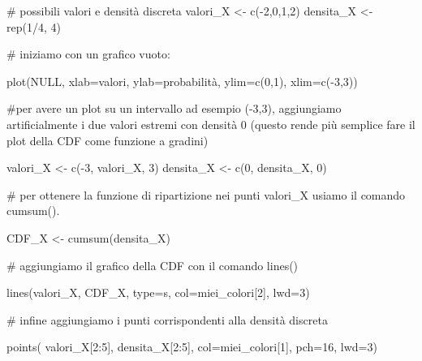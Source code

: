 \documentclass[
  italian,
  letterpaper,
]{book}
\newenvironment{Shaded}{\begin{snugshade}}{\end{snugshade}}
\newcommand{\AttributeTok}[1]{\textcolor[rgb]{0.40,0.45,0.13}{#1}}
\newcommand{\CommentTok}[1]{\textcolor[rgb]{0.37,0.37,0.37}{#1}}
\newcommand{\ConstantTok}[1]{\textcolor[rgb]{0.56,0.35,0.01}{#1}}
\newcommand{\DecValTok}[1]{\textcolor[rgb]{0.68,0.00,0.00}{#1}}
\newcommand{\FunctionTok}[1]{\textcolor[rgb]{0.28,0.35,0.67}{#1}}
\newcommand{\NormalTok}[1]{\textcolor[rgb]{0.00,0.23,0.31}{#1}}
\newcommand{\OtherTok}[1]{\textcolor[rgb]{0.00,0.23,0.31}{#1}}
\newcommand{\SpecialCharTok}[1]{\textcolor[rgb]{0.37,0.37,0.37}{#1}}
\newcommand{\StringTok}[1]{\textcolor[rgb]{0.13,0.47,0.30}{#1}}
\theoremstyle{definition}
\theoremstyle{remark}
\begin{document}
\begin{Shaded}
\begin{Highlighting}[]
\CommentTok{\# possibili valori e densità discreta}
\NormalTok{valori\_X }\OtherTok{\textless{}{-}} \FunctionTok{c}\NormalTok{(}\SpecialCharTok{{-}}\DecValTok{2}\NormalTok{,}\DecValTok{0}\NormalTok{,}\DecValTok{1}\NormalTok{,}\DecValTok{2}\NormalTok{)}
\NormalTok{densita\_X }\OtherTok{\textless{}{-}} \FunctionTok{rep}\NormalTok{(}\DecValTok{1}\SpecialCharTok{/}\DecValTok{4}\NormalTok{, }\DecValTok{4}\NormalTok{)}

\CommentTok{\# iniziamo con un grafico vuoto:}


\FunctionTok{plot}\NormalTok{(}\ConstantTok{NULL}\NormalTok{, }\AttributeTok{xlab=}\StringTok{\textquotesingle{}valori\textquotesingle{}}\NormalTok{, }\AttributeTok{ylab=}\StringTok{\textquotesingle{}probabilità\textquotesingle{}}\NormalTok{, }\AttributeTok{ylim=}\FunctionTok{c}\NormalTok{(}\DecValTok{0}\NormalTok{,}\DecValTok{1}\NormalTok{), }\AttributeTok{xlim=}\FunctionTok{c}\NormalTok{(}\SpecialCharTok{{-}}\DecValTok{3}\NormalTok{,}\DecValTok{3}\NormalTok{))}

\CommentTok{\#per avere un plot su un intervallo ad esempio ({-}3,3), aggiungiamo artificialmente i due valori estremi con densità 0 (questo rende più semplice fare il plot della CDF come funzione a gradini)}

\NormalTok{valori\_X }\OtherTok{\textless{}{-}} \FunctionTok{c}\NormalTok{(}\SpecialCharTok{{-}}\DecValTok{3}\NormalTok{, valori\_X, }\DecValTok{3}\NormalTok{)}
\NormalTok{densita\_X }\OtherTok{\textless{}{-}} \FunctionTok{c}\NormalTok{(}\DecValTok{0}\NormalTok{, densita\_X, }\DecValTok{0}\NormalTok{)}


\CommentTok{\# per ottenere la funzione di ripartizione nei punti valori\_X usiamo il comando cumsum().}

\NormalTok{CDF\_X }\OtherTok{\textless{}{-}} \FunctionTok{cumsum}\NormalTok{(densita\_X)}


\CommentTok{\# aggiungiamo il grafico della CDF con il comando lines()}


\FunctionTok{lines}\NormalTok{(valori\_X, CDF\_X, }\AttributeTok{type=}\StringTok{\textquotesingle{}s\textquotesingle{}}\NormalTok{, }\AttributeTok{col=}\NormalTok{miei\_colori[}\DecValTok{2}\NormalTok{], }\AttributeTok{lwd=}\DecValTok{3}\NormalTok{)}

\CommentTok{\# infine aggiungiamo i punti corrispondenti alla densità discreta}


\FunctionTok{points}\NormalTok{( valori\_X[}\DecValTok{2}\SpecialCharTok{:}\DecValTok{5}\NormalTok{], densita\_X[}\DecValTok{2}\SpecialCharTok{:}\DecValTok{5}\NormalTok{], }\AttributeTok{col=}\NormalTok{miei\_colori[}\DecValTok{1}\NormalTok{], }\AttributeTok{pch=}\DecValTok{16}\NormalTok{, }\AttributeTok{lwd=}\DecValTok{3}\NormalTok{)}
\end{Highlighting}
\end{Shaded}
\end{document}
